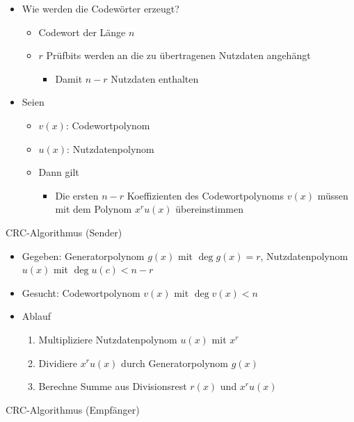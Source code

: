       \begin{itemize}
        \item Wie werden die Codewörter erzeugt?
          \begin{itemize}
            \item Codewort der Länge $n$
            \item $r$ Prüfbits werden an die zu übertragenen Nutzdaten angehängt
              \begin{itemize}
                \item Damit $n-r$ Nutzdaten enthalten
              \end{itemize}
          \end{itemize}
        \item Seien
          \begin{itemize}
            \item $v(x)$: Codewortpolynom
            \item $u(x)$: Nutzdatenpolynom
            \item Dann gilt
              \begin{itemize}
                \item Die ersten $n-r$ Koeffizienten des Codewortpolynoms $v(x)$ müssen mit dem
                  Polynom $x^ru(x)$ übereinstimmen
              \end{itemize}
          \end{itemize}
      \end{itemize}
      CRC-Algorithmus (Sender)
      \begin{itemize}
        \item Gegeben: Generatorpolynom $g(x)$ mit $\deg g(x)=r$, Nutzdatenpolynom $u(x)$ mit 
          $\deg u(c)<n-r$
        \item Gesucht: Codewortpolynom $v(x)$ mit $\deg v(x)<n$
        \item Ablauf
          \begin{enumerate}[label=\arabic*)]
            \item Multipliziere Nutzdatenpolynom $u(x)$ mit $x^r$
            \item Dividiere $x^ru(x)$ durch Generatorpolynom $g(x)$
            \item Berechne Summe aus Divisionsrest $r(x)$ und $x^ru(x)$
          \end{enumerate}
      \end{itemize}
      CRC-Algorithmus (Empfänger)
